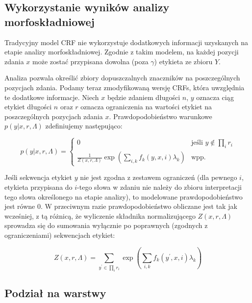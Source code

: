 \documentclass[a4paper,10]{article}
\begin{document}
\subsection{Wykorzystanie wyników analizy morfoskładniowej}

Tradycyjny model CRF nie wykorzystuje dodatkowych informacji
uzyskanych na etapie analizy morfoskładniowej.
Zgodnie z takim modelem, na każdej pozycji zdania $x$ może zostać przypisana
dowolna (poza $\gamma$) etykieta ze zbioru $Y$.

Analiza pozwala określić zbiory dopuszczalnych znaczników
na poszczególnych pozycjach zdania. Podamy teraz zmodyfikowaną
wersję CRFs, która uwzględnia te dodatkowe informacje.
Niech $x$ będzie zdaniem długości $n$, $y$ oznacza ciąg etykiet
długości $n$ oraz $r$ oznacza ograniczenia na wartości etykiet na poszczególnych
pozycjach zdania $x$.
Prawdopodobieństwo warunkowe $p(y \vert x, r, \Lambda)$ zdefiniujemy następująco:

\begin{equation}\label{restricted_crf}
p(y \vert x, r, \Lambda) = \left\{
 \begin{array}{cl}
  0 & \mbox{jeśli } y \notin \prod_i r_i\\
  \frac{1}{Z(x, r, \Lambda)} \exp \left( \sum_{i, k} f_k(y, x, i)
  \lambda_k \right) & \mbox{wpp.}
 \end{array} \right.
\end{equation}

Jeśli sekwencja etykiet $y$ nie jest zgodna z zestawem ograniczeń
(dla pewnego $i$, etykieta przypisana do $i$-tego słowa w zdaniu
nie należy do zbioru interpretacji tego słowa określonego na etapie analizy),
to modelowane prawdopodobieństwo jest równe $0$.
W przeciwnym razie prawdopodobieństwo obliczane jest tak jak wcześniej,
z tą różnicą, że wyliczenie składnika normalizującego $Z(x, r, \Lambda)$ sprowadza się
do sumowania wyłącznie po poprawnych (zgodnych z ograniczeniami)
sekwencjach etykiet:

\begin{equation}
Z(x, r, \Lambda) = \sum_{y^\prime \in \prod_i r_i} \exp
\left( \sum_{i, k} f_k(y^\prime, x, i) \lambda_k \right)
\end{equation}

\subsection{Podział na warstwy}\label{sec:layers}
\end{document}
